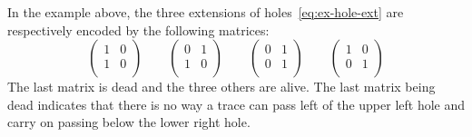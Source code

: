 \documentclass[orivec]{llncs} \usepackage[T1]{fontenc}
\begin{document}
\begin{example}
  \label{ex:mat2d}
  In the example above, the three extensions of holes~\eqref{eq:ex-hole-ext} are
  respectively encoded by the following matrices:
  \[
  \left(
    \begin{matrix}
      1&0\\
      1&0\\
    \end{matrix}
  \right)
  \qquad
  \left(
    \begin{matrix}
      0&1\\
      1&0\\
    \end{matrix}
  \right)
  \qquad
  \left(
    \begin{matrix}
      0&1\\
      0&1\\
    \end{matrix}
  \right)
  \qquad
  \left(
    \begin{matrix}
      1&0\\
      0&1\\
    \end{matrix}
  \right)
  \]
  The last matrix is dead and the three others are alive. The last matrix being
  dead indicates that there is no way a trace can pass left of the upper left
  hole and carry on passing below the lower right hole.
\end{example}
\end{document}
